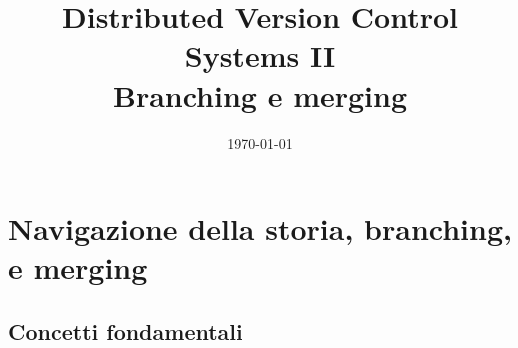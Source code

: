 \documentclass[presentation]{beamer}
\title[{\lab} -- DVCS2]{Distributed Version Control Systems II \\
Branching e merging}
\date[\today]{\today}
\begin{document}
	
\frame[label=coverpage]{\titlepage}

\newcommand{\al}[0]{\textless}
\newcommand{\ar}[0]{\textgreater}
\newcommand{\gen}[1]{\al{}#1\ar{}}
\newcommand{\imgfr}[4]{\fr{#1}{#2
\begin{center}
\texttt{[image: \#4]}                    
\end{center}
}}

\section{Navigazione della storia, branching, e merging}

\subsection{Concetti fondamentali}
\end{document}
